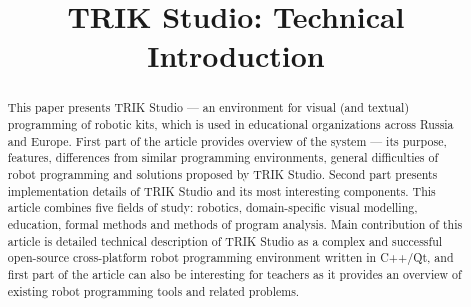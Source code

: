 \documentclass[conference]{IEEEtran}
\begin{document}
\title{TRIK Studio: Technical Introduction}
\date{}%

\author{
\and
}

\maketitle

\begin{abstract}
This paper presents TRIK Studio --- an environment for visual (and textual) programming of robotic kits, which is used in educational organizations across Russia and Europe. First part of the article provides overview of the system --- its purpose, features, differences from similar programming environments, general difficulties of robot programming and solutions proposed by TRIK Studio. Second part presents implementation details of TRIK Studio and its most interesting components. This article combines five fields of study: robotics, domain-specific visual modelling, education, formal methods and methods of program analysis. Main contribution of this article is detailed technical description of TRIK Studio as a complex and successful open-source cross-platform robot programming environment written in C++/Qt, and first part of the article can also be interesting for teachers as it provides an overview of existing robot programming tools and related problems.
\end{abstract}
\end{document}
